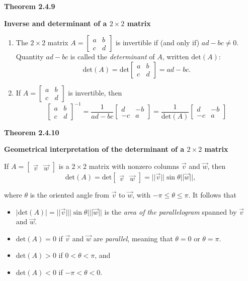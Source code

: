 \textbf{Theorem 2.4.9}\\
\par\noindent\textbf{Inverse and determinant of a $2\times{}2$ matrix}
\renewcommand{\labelenumi}{\textbf{\alph{enumi}.}}
\begin{enumerate}
\item The $2\times{}2$ matrix $A=\left[\begin{array}{cc}a&b\\ c&d\end{array}\right]$ is invertible if (and only if) $ad-bc\ne{}0$. Quantity $ad-bc$ is called the \textit{determinant} of $A$, written $\textrm{det}(A)$:
\[\textrm{det}(A)=\textrm{det}\left[\begin{array}{cc}a&b\\ c&d\end{array}\right]=ad-bc.\]
\item If $A=\left[\begin{array}{cc}a&b\\ c&d\end{array}\right]$ is invertible, then
\[\left[\begin{array}{cc}a&b\\ c&d\end{array}\right]^{-1}=\frac{1}{ad-bc}\left[\begin{array}{rr}d&-b\\ -c&a\end{array}\right]=\frac{1}{\textrm{det}(A)}\left[\begin{array}{rr}d&-b\\ -c&a\end{array}\right]\]
\end{enumerate}
\textbf{Theorem 2.4.10}\\
\par\noindent\textbf{Geometrical interpretation of the determinant of a $2\times{}2$ matrix}
\par\noindent If $A=\left[\begin{array}{cc}\vec{v}&\vec{w}\end{array}\right]$ is a $2\times{}2$ matrix with nonzero columns $\vec{v}$ and $\vec{w}$, then
\[\textrm{det}(A)=\textrm{det}\left[\begin{array}{cc}\vec{v}&\vec{w}\end{array}\right]=||\vec{v}||\sin\theta{}||\vec{w}||,\]
\par\noindent where $\theta$ is the oriented angle from $\vec{v}$ to $\vec{w}$, with $-\pi\le\theta\le\pi$. It follows that
\begin{itemize}
\item $|\textrm{det}(A)|=||\vec{v}|||\sin\theta{}|||\vec{w}||$ is the \textit{area of the parallelogram} spanned by $\vec{v}$ and $\vec{w}$.
\item $\textrm{det}(A)=0$ if $\vec{v}$ and $\vec{w}$ are \textit{parallel}, meaning that $\theta=0$ or $\theta=\pi$.
\item $\textrm{det}(A)>0$ if $0<\theta<\pi$, and
\item $\textrm{det}(A)<0$ if $-\pi<\theta<0$.
\end{itemize}
\pagebreak

